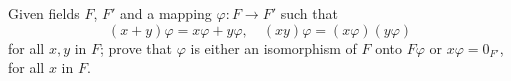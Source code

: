 Given fields $F$, $F'$ and a mapping $\varphi: F \rightarrow F'$ such that
$$(x+y)\varphi = x\varphi + y\varphi, \quad (xy)\varphi = (x\varphi)(y\varphi)$$
for all $x, y$ in $F$; prove that $\varphi$ is either an isomorphism of $F$ onto $F\varphi$ or $x\varphi = 0_{F'}$, for all $x$ in $F$.
